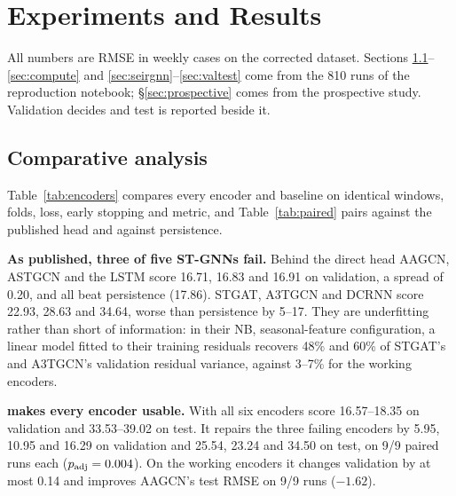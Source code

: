 %
\section{Experiments and Results}
\label{sec:experiments}

All numbers are RMSE in weekly cases on the corrected dataset. Sections
\ref{sec:comparative}--\ref{sec:compute} and
\ref{sec:seirgnn}--\ref{sec:valtest} come from the 810 runs of the reproduction
notebook; \S\ref{sec:prospective} comes from the prospective study. Validation decides
and test is reported beside it.

\subsection{Comparative analysis}
\label{sec:comparative}
Table~\ref{tab:encoders} compares every encoder and baseline on identical windows,
folds, loss, early stopping and metric, and Table~\ref{tab:paired} pairs \model{}
against the published head and against persistence.

\textbf{As published, three of five ST-GNNs fail.} Behind the direct head AAGCN,
ASTGCN and the LSTM score 16.71, 16.83 and 16.91 on validation, a spread of 0.20, and
all beat persistence (17.86). STGAT, A3TGCN and DCRNN score 22.93, 28.63 and 34.64,
worse than persistence by 5--17. They are underfitting rather than short of
information: in their NB, seasonal-feature configuration, a linear model fitted to their
training residuals recovers 48\% and 60\% of STGAT's and A3TGCN's validation residual
variance, against 3--7\% for the
working encoders.

\textbf{\model{} makes every encoder usable.} With \model{} all six encoders score
16.57--18.35 on validation and 33.53--39.02 on test. It repairs the three failing
encoders by 5.95, 10.95 and 16.29 on validation and 25.54, 23.24 and 34.50 on test, on
9/9 paired runs each ($p_{\text{adj}}=0.004$). On the working encoders it changes validation by
at most 0.14 and improves AAGCN's test RMSE on 9/9 runs ($-1.62$).

